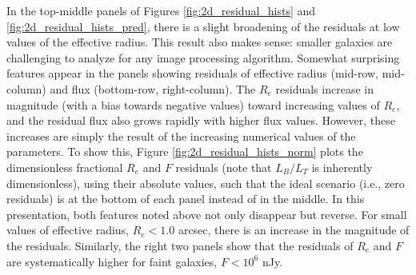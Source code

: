 \documentclass[twocolumn]{aastex63}
\begin{document}
\begin{CJK*}{UTF8}{gbsn}
In the top-middle panels of Figures \ref{fig:2d_residual_hists} and \ref{fig:2d_residual_hists_pred}, there is a slight broadening of the residuals at low values of the effective radius. This result also makes sense: smaller galaxies are challenging to analyze for any image processing algorithm. Somewhat surprising features appear in the panels showing residuals of effective radius (mid-row, mid-column) and flux (bottom-row, right-column). The $R_e$ residuals increase in magnitude (with a bias towards negative values) toward increasing values of $R_e$, and the residual flux also grows rapidly with higher flux values. However, these increases are simply the result of the increasing numerical values of the parameters. To show this, Figure \ref{fig:2d_residual_hists_norm} plots the dimensionless fractional $R_e$ and $F$ residuals (note that $L_B/L_T$ is inherently dimensionless), using their absolute values, such that the ideal scenario (i.e., zero residuals) is at the bottom of each panel instead of in the middle. 
In this presentation, both features noted above not only disappear but reverse.
For small values of effective radius, $R_e < 1.0$ arcsec, there is an increase in the magnitude of the residuals.
Similarly, the right two panels show that the residuals of $R_e$ and $F$ are systematically higher for faint galaxies, $F< 10^6$ nJy.%


\end{CJK*}
\end{document}
